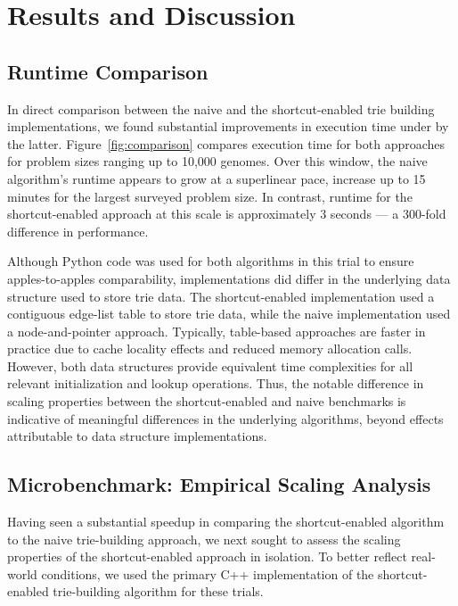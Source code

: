 \section{Results and Discussion} \label{sec:results}

\subsection{Runtime Comparison}

In direct comparison between the naive and the shortcut-enabled trie building implementations, we found substantial improvements in execution time under by the latter.
Figure~\ref{fig:comparison} compares execution time for both approaches for problem sizes ranging up to 10,000 genomes.
Over this window, the naive algorithm's runtime appears to grow at a superlinear pace, increase up to 15 minutes for the largest surveyed problem size.
In contrast, runtime for the shortcut-enabled approach at this scale is approximately 3 seconds --- a 300-fold difference in performance.



Although Python code was used for both algorithms in this trial to ensure apples-to-apples comparability, implementations did differ in the underlying data structure used to store trie data.
The shortcut-enabled implementation used a contiguous edge-list table to store trie data, while the naive implementation used a node-and-pointer approach.
Typically, table-based approaches are faster in practice due to cache locality effects and reduced memory allocation calls.
However, both data structures provide equivalent time complexities for all relevant initialization and lookup operations.
Thus, the notable difference in scaling properties between the shortcut-enabled and naive benchmarks is indicative of meaningful differences in the underlying algorithms, beyond effects attributable to data structure implementations.

\subsection{Microbenchmark: Empirical Scaling Analysis}



Having seen a substantial speedup in comparing the shortcut-enabled algorithm to the naive trie-building approach, we next sought to assess the scaling properties of the shortcut-enabled approach in isolation.
To better reflect real-world conditions, we used the primary C++ implementation of the shortcut-enabled trie-building algorithm for these trials.

